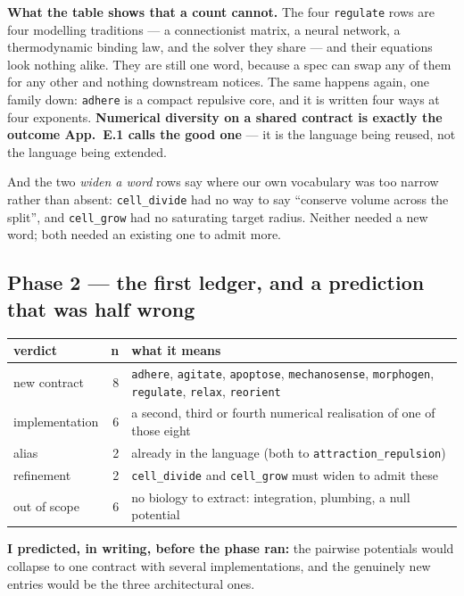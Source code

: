 \documentclass[11pt,a4paper]{article}
\newcommand{\code}[1]{\texttt{#1}}
\begin{document}


\textbf{What the table shows that a count cannot.} The four \code{regulate} rows are four
modelling traditions --- a connectionist matrix, a neural network, a thermodynamic binding law,
and the solver they share --- and their equations look nothing alike. They are still one word,
because a spec can swap any of them for any other and nothing downstream notices. The same
happens again, one family down: \code{adhere} is a compact repulsive core, and it is written four
ways at four exponents. \textbf{Numerical diversity on a shared contract is exactly the outcome
App.~E.1 calls the good one} --- it is the language being reused, not the language being
extended.

And the two \emph{widen a word} rows say where our own vocabulary was too narrow rather than
absent: \code{cell\_divide} had no way to say ``conserve volume across the split'', and
\code{cell\_grow} had no saturating target radius. Neither needed a new word; both needed an
existing one to admit more.

\subsection{Phase 2 --- the first ledger, and a prediction that was half wrong}

\begin{center}
\small
\begin{tabular}{@{}l r p{8.6cm}@{}}
\toprule
\textbf{verdict} & \textbf{n} & \textbf{what it means}\\
\midrule
new contract & 8 & \code{adhere}, \code{agitate}, \code{apoptose}, \code{mechanosense},
\code{morphogen}, \code{regulate}, \code{relax}, \code{reorient}\\
implementation & 6 & a second, third or fourth numerical realisation of one of those eight\\
alias & 2 & already in the language (both to \code{attraction\_repulsion})\\
refinement & 2 & \code{cell\_divide} and \code{cell\_grow} must widen to admit these\\
out of scope & 6 & no biology to extract: integration, plumbing, a null potential\\
\bottomrule
\end{tabular}
\end{center}

\textbf{I predicted, in writing, before the phase ran:} the pairwise potentials would collapse to
one contract with several implementations, and the genuinely new entries would be the three
architectural ones.
\end{document}
